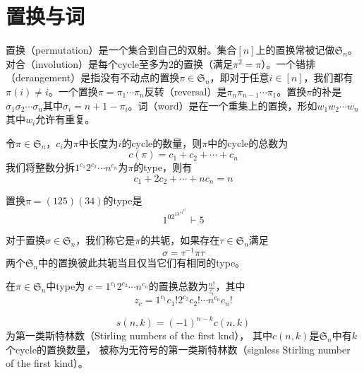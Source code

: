 \section{置换与词}
\begin{definition}
	置换（permutation）是一个集合到自己的双射。集合$[n]$上的置换常被记做$\mathfrak{S}_n$。对合（involution）是每个cycle至多为$2$的置换（满足$\pi^2 = \pi$）。一个错排（derangement）是指没有不动点的置换$\pi \in \mathfrak{S}_n$，即对于任意$i\in [n]$，我们都有$\pi(i)\neq i$。一个置换$\pi = \pi_1\cdots \pi_n$反转（reversal）是$\pi_n \pi_{n-1}\cdots  \pi_1$。置换$\pi$的补是$\sigma_1\sigma_2\cdots \sigma_n$其中$\sigma_i = n+1-\pi_i$。词（word）是在一个重集上的置换，形如$w_1w_2\cdots w_n$其中$w_i$允许有重复。
\end{definition}
令$\pi \in \mathfrak{S}_n$，$c_i$为$\pi$中长度为$i$的cycle的数量，则$\pi$中的cycle的总数为
\begin{equation*}
	c(\pi) = c_1+c_2+\cdots+c_n
\end{equation*}
我们将整数分拆$1^{c_1}2^{c_2}\cdots n^{c_n}$为$\pi$的type，则有
\begin{equation*}
	c_1+2c_2+\cdots+nc_n = n
\end{equation*}
\begin{example}
	置换$\pi = (125)(34)$的type是
	\begin{equation*}
		1^02^13^14^05^0\vdash 5
	\end{equation*}
\end{example}
\begin{proposition}
	对于置换$\sigma\in\mathfrak{S}_n$，我们称它是$\pi$的共轭，如果存在$\tau\in\mathfrak{S}_n$满足
	\begin{equation*}
		\sigma = \tau^{-1}\pi\tau
	\end{equation*}
	两个$\mathfrak S_n$中的置换彼此共轭当且仅当它们有相同的type。
\end{proposition}
\begin{proposition}
	在$\pi\in\mathfrak S_n$中type为 $c= 1^{c_1}2^{c_2}\cdots n^{c_n}$的置换总数为$\frac{n!}{z_c}$，其中
	\begin{equation*}
		z_c = 1^{c_1} c_1!2^{c_2}c_2!\cdots n^{c_n}c_n!
	\end{equation*}
\end{proposition}
\begin{definition}
	\begin{equation*}
		s(n, k) = (-1)^{n-k}c(n, k)
	\end{equation*}
	为第一类斯特林数（Stirling numbers of the first knd）， 其中$c(n, k)$是$\mathfrak S_n$中有$k$个cycle的置换数量， 被称为无符号的第一类斯特林数（signless Stirling number of the first kind）。
\end{definition}
